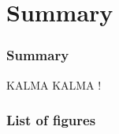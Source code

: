 \documentclass{beamer}
\begin{document}
\section{Summary}

\begin{frame}
    \frametitle{Summary}
    KALMA KALMA !
\end{frame}

\begin{frame}
    \frametitle{List of figures}
    \listoffigures
\end{frame}
\end{document}
